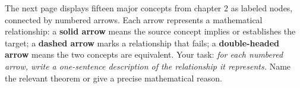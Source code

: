\documentclass[worksheet]{workbook}
\begin{document}
\maketitle

The next page displays fifteen major concepts from chapter 2 as labeled nodes, connected by numbered arrows.  Each arrow represents a mathematical relationship: a \textbf{solid arrow} means the source concept implies or establishes the target; a \textbf{dashed arrow} marks a relationship that \alert{fails}; a \textbf{double-headed arrow} means the two concepts are equivalent.  Your task: \textit{for each numbered arrow, write a one-sentence description of the relationship it represents.}  Name the relevant theorem or give a precise mathematical reason.

\bigskip


\medskip
\small
\end{document}

